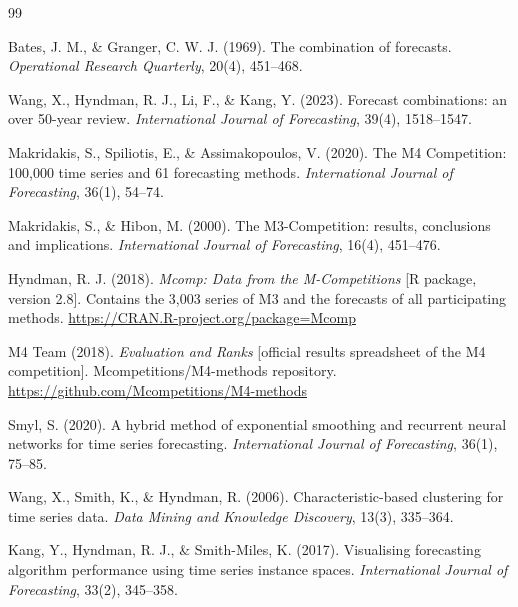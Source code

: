 {\scriptsize
\begin{thebibliography}{99}
\setlength{\itemsep}{0pt}\setlength{\parskip}{0pt}

Bates, J. M., \& Granger, C. W. J. (1969). The combination of forecasts.
\emph{Operational Research Quarterly}, 20(4), 451--468.

Wang, X., Hyndman, R. J., Li, F., \& Kang, Y. (2023). Forecast combinations: an over
50-year review. \emph{International Journal of Forecasting}, 39(4), 1518--1547.

Makridakis, S., Spiliotis, E., \& Assimakopoulos, V. (2020).
The M4 Competition: 100,000 time series and 61 forecasting methods.
\emph{International Journal of Forecasting}, 36(1), 54--74.

Makridakis, S., \& Hibon, M. (2000). The M3-Competition: results, conclusions and
implications. \emph{International Journal of Forecasting}, 16(4), 451--476.

Hyndman, R. J. (2018). \emph{Mcomp: Data from the M-Competitions} [R package,
version 2.8]. Contains the 3,003 series of M3 and the forecasts of all participating
methods. \url{https://CRAN.R-project.org/package=Mcomp}

M4 Team (2018). \emph{Evaluation and Ranks} [official results spreadsheet of the
M4 competition]. Mcompetitions/M4-methods repository.
\url{https://github.com/Mcompetitions/M4-methods}

Smyl, S. (2020). A hybrid method of exponential smoothing and recurrent neural
networks for time series forecasting.
\emph{International Journal of Forecasting}, 36(1), 75--85.

Wang, X., Smith, K., \& Hyndman, R. (2006).
Characteristic-based clustering for time series data.
\emph{Data Mining and Knowledge Discovery}, 13(3), 335--364.

Kang, Y., Hyndman, R. J., \& Smith-Miles, K. (2017). Visualising forecasting algorithm
performance using time series instance spaces.
\emph{International Journal of Forecasting}, 33(2), 345--358.


\end{thebibliography}}
